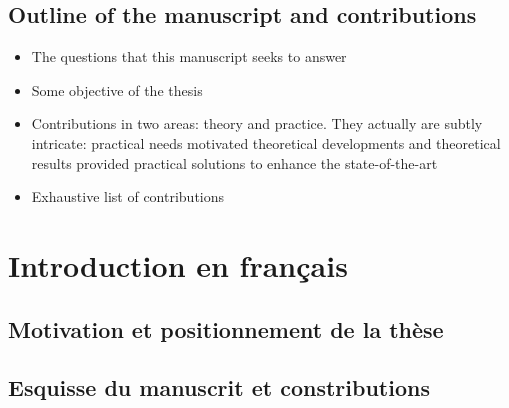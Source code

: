 \section{Outline of the manuscript and contributions}

\begin{itemize}
    \item The questions that this manuscript seeks to answer
    \item Some objective of the thesis
    \item Contributions in two areas: theory and practice. They actually are subtly intricate: practical needs motivated theoretical developments and theoretical results provided practical solutions to enhance the state-of-the-art
    \item Exhaustive list of contributions
\end{itemize}






\chapter{Introduction en français}

\section{Motivation et positionnement de la thèse}

\section{Esquisse du manuscrit et constributions}